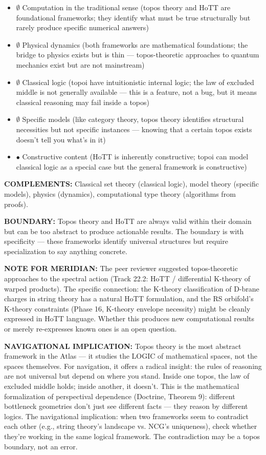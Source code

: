 \begin{itemize}[nosep,leftmargin=*]
  \item $\emptyset$ Computation in the traditional sense (topos theory and HoTT are foundational frameworks; they identify what must be true structurally but rarely produce specific numerical answers)
  \item $\emptyset$ Physical dynamics (both frameworks are mathematical foundations; the bridge to physics exists but is thin — topos-theoretic approaches to quantum mechanics exist but are not mainstream)
  \item $\emptyset$ Classical logic (topoi have intuitionistic internal logic; the law of excluded middle is not generally available — this is a feature, not a bug, but it means classical reasoning may fail inside a topos)
  \item $\emptyset$ Specific models (like category theory, topos theory identifies structural necessities but not specific instances — knowing that a certain topos exists doesn't tell you what's in it)
  \item $\bullet$ Constructive content (HoTT is inherently constructive; topoi can model classical logic as a special case but the general framework is constructive)
\end{itemize}


\textbf{COMPLEMENTS:} Classical set theory (classical logic), model theory (specific models), physics (dynamics), computational type theory (algorithms from proofs).


\textbf{BOUNDARY:} Topos theory and HoTT are always valid within their domain but can be too abstract to produce actionable results. The boundary is with specificity — these frameworks identify universal structures but require specialization to say anything concrete.


\textbf{NOTE FOR MERIDIAN:} The peer reviewer suggested topos-theoretic approaches to the spectral action (Track 22.2: HoTT / differential K-theory of warped products). The specific connection: the K-theory classification of D-brane charges in string theory has a natural HoTT formulation, and the RS orbifold's K-theory constraints (Phase 16, K-theory envelope necessity) might be cleanly expressed in HoTT language. Whether this produces new computational results or merely re-expresses known ones is an open question.


\textbf{NAVIGATIONAL IMPLICATION:} Topos theory is the most abstract framework in the Atlas — it studies the LOGIC of mathematical spaces, not the spaces themselves. For navigation, it offers a radical insight: the rules of reasoning are not universal but depend on where you stand. Inside one topos, the law of excluded middle holds; inside another, it doesn't. This is the mathematical formalization of perspectival dependence (Doctrine, Theorem 9): different bottleneck geometries don't just see different facts — they reason by different logics. The navigational implication: when two frameworks seem to contradict each other (e.g., string theory's landscape vs. NCG's uniqueness), check whether they're working in the same logical framework. The contradiction may be a topos boundary, not an error.


